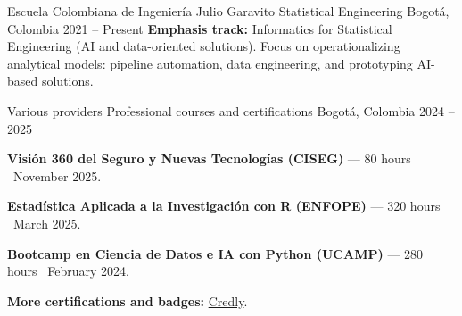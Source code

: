
\begin{cventries}

  \cventry
    {Escuela Colombiana de Ingeniería Julio Garavito}
    {Statistical Engineering}
    {Bogotá, Colombia}
    {2021 -- Present}
    {
      \vspace{0.3em}
      {\textbf{Emphasis track:} Informatics for Statistical Engineering (AI and data-oriented solutions).
      Focus on operationalizing analytical models: pipeline automation, data engineering, and prototyping AI-based solutions.}
    }

  \vspace{0.6em}

  \cventry
    {Various providers}
    {Professional courses and certifications}
    {Bogotá, Colombia}
    {2024 -- 2025}
    {
      \begin{cvitems}
        \item {\textbf{Visión 360 del Seguro y Nuevas Tecnologías (CISEG)} --- 80 hours \textbar\ November 2025.}
        \item {\textbf{Estadística Aplicada a la Investigación con R (ENFOPE)} --- 320 hours \textbar\ March 2025.}
        \item {\textbf{Bootcamp en Ciencia de Datos e IA con Python (UCAMP)} --- 280 hours \textbar\ February 2024.}
        \item {\textbf{More certifications and badges:} \href{https://www.credly.com/users/sebastian-ramirez.6d8f476f}{Credly}.}
      \end{cvitems}
    }


\end{cventries}
